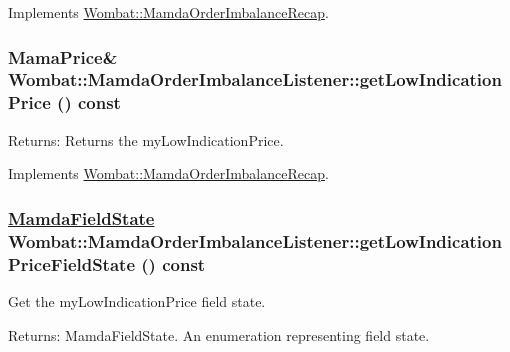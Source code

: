 Implements \hyperlink{classWombat_1_1MamdaOrderImbalanceRecap_7515d1c6c386cc1e68039922968fdb9d}{Wombat::Mamda\-Order\-Imbalance\-Recap}.\hypertarget{classWombat_1_1MamdaOrderImbalanceListener_d52ff9594f69255d8ac514ffa8eabc84}{
\subsubsection[getLowIndicationPrice]{\setlength{\rightskip}{0pt plus 5cm}Mama\-Price\& Wombat::Mamda\-Order\-Imbalance\-Listener::get\-Low\-Indication\-Price () const}}
\label{classWombat_1_1MamdaOrderImbalanceListener_d52ff9594f69255d8ac514ffa8eabc84}


\begin{Desc}
\item[Returns:]Returns the my\-Low\-Indication\-Price. \end{Desc}


Implements \hyperlink{classWombat_1_1MamdaOrderImbalanceRecap_b5dda63ec532e8d11a6a07a380d5470f}{Wombat::Mamda\-Order\-Imbalance\-Recap}.\hypertarget{classWombat_1_1MamdaOrderImbalanceListener_e6c44322841ce2147abacb25a5cf8fae}{
\subsubsection[getLowIndicationPriceFieldState]{\setlength{\rightskip}{0pt plus 5cm}\hyperlink{namespaceWombat_93aac974f2ab713554fd12a1fa3b7d2a}{Mamda\-Field\-State} Wombat::Mamda\-Order\-Imbalance\-Listener::get\-Low\-Indication\-Price\-Field\-State () const}}
\label{classWombat_1_1MamdaOrderImbalanceListener_e6c44322841ce2147abacb25a5cf8fae}


Get the my\-Low\-Indication\-Price field state. 

\begin{Desc}
\item[Returns:]Mamda\-Field\-State. An enumeration representing field state. \end{Desc}


